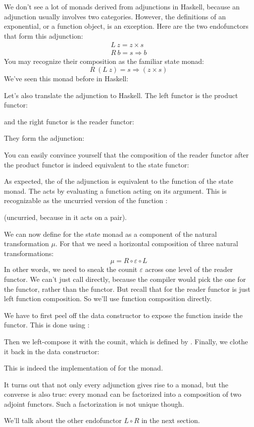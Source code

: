 We don't see a lot of monads derived from adjunctions in Haskell,
because an adjunction usually involves two categories. However, the
definitions of an exponential, or a function object, is an exception.
Here are the two endofunctors that form this adjunction:
\begin{gather*}
L\ z = z\times{}s \\
R\ b = s \Rightarrow b
\end{gather*}
You may recognize their composition as the familiar state monad:
\[R\ (L\ z) = s \Rightarrow (z\times{}s)\]
We've seen this monad before in Haskell:

Let's also translate the adjunction to Haskell. The left functor is the
product functor:

and the right functor is the reader functor:

They form the adjunction:

You can easily convince yourself that the composition of the reader
functor after the product functor is indeed equivalent to the state
functor:

As expected, the  of the adjunction is equivalent to the
 function of the state monad. The  acts by
evaluating a function acting on its argument. This is recognizable as
the uncurried version of the function :

(uncurried, because in  it acts on a pair).

We can now define  for the state monad as a component of
the natural transformation $\mu$. For that we need a horizontal composition
of three natural transformations:
\[\mu = R \circ \varepsilon \circ L\]
In other words, we need to sneak the counit $\varepsilon$ across one level of the
reader functor. We can't just call  directly, because the
compiler would pick the one for the  functor, rather than
the  functor. But recall that  for the
reader functor is just left function composition. So we'll use function
composition directly.

We have to first peel off the data constructor  to expose
the function inside the  functor. This is done using
:

Then we left-compose it with the counit, which is defined by
. Finally, we clothe it back in the
 data constructor:

This is indeed the implementation of  for the
 monad.

It turns out that not only every adjunction gives rise to a monad, but
the converse is also true: every monad can be factorized into a
composition of two adjoint functors. Such a factorization is not unique
though.

We'll talk about the other endofunctor $L \circ R$ in the next
section.
